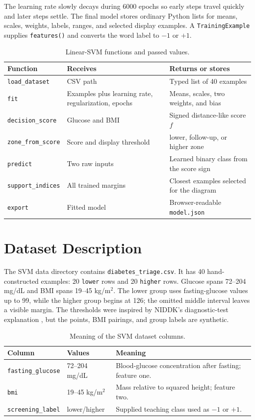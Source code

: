 \documentclass[12pt,a4paper,openany]{report}
\newcommand{\sourcepath}[1]{\texttt{#1}}
\begin{document}
The learning rate slowly decays during 6000 epochs so early steps travel
quickly and later steps settle. The final model stores ordinary Python lists
for means, scales, weights, labels, ranges, and selected display examples. A
\texttt{TrainingExample} supplies \texttt{features()} and converts the word
label to $-1$ or $+1$.

\begin{table}[H]
\centering
\caption{Linear-SVM functions and passed values.}
\begin{tabularx}{\textwidth}{p{}YY}
\toprule
\textbf{Function} & \textbf{Receives} & \textbf{Returns or stores} \\
\midrule
\texttt{load\_dataset} & CSV path & Typed list of 40 examples \\
\texttt{fit} & Examples plus learning rate, regularization, epochs & Means, scales, two weights, and bias \\
\texttt{decision\_score} & Glucose and BMI & Signed distance-like score $f$ \\
\texttt{zone\_from\_score} & Score and display threshold & lower, follow-up, or higher zone \\
\texttt{predict} & Two raw inputs & Learned binary class from the score sign \\
\texttt{support\_indices} & All trained margins & Closest examples selected for the diagram \\
\texttt{export} & Fitted model & Browser-readable \texttt{model.json} \\
\bottomrule
\end{tabularx}
\end{table}

\section{Dataset Description}
The SVM data directory contains \sourcepath{diabetes\_triage.csv}. It has 40
hand-constructed examples: 20 \texttt{lower} rows and 20 \texttt{higher}
rows. Glucose spans 72--204 mg/dL and BMI spans 19--45 kg/m$^2$. The lower
group uses fasting-glucose values up to 99, while the higher group begins at
126; the omitted middle interval leaves a visible margin. The thresholds were
inspired by NIDDK's diagnostic-test explanation \cite{niddk}, but the points,
BMI pairings, and group labels are synthetic.

\begin{table}[H]
\centering
\caption{Meaning of the SVM dataset columns.}
\begin{tabularx}{\textwidth}{p{}p{}Y}
\toprule
\textbf{Column} & \textbf{Values} & \textbf{Meaning} \\
\midrule
\texttt{fasting\_glucose} & 72--204 mg/dL & Blood-glucose concentration after fasting; feature one. \\
\texttt{bmi} & 19--45 kg/m$^2$ & Mass relative to squared height; feature two. \\
\texttt{screening\_label} & lower/higher & Supplied teaching class used as $-1$ or $+1$. \\
\bottomrule
\end{tabularx}
\end{table}
\end{document}
